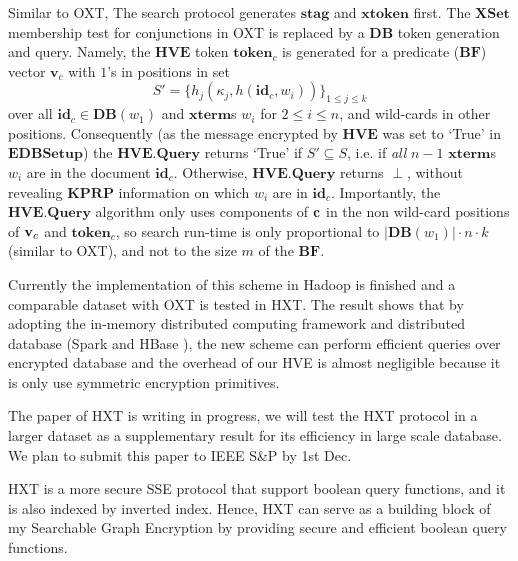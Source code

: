 Similar to OXT, The search protocol generates $\mathbf{stag}$ and $\mathbf{xtoken}$ first. The $\mathbf{XSet}$ membership test for conjunctions in OXT is replaced by a $\mathbf{DB}$ token generation and query. Namely, the $\mathbf{HVE}$ token $\mathbf{token}_c$ is generated for a predicate ($\mathbf{BF}$) vector $\mathbf{v}_c$ with $1$'s in positions in set 
$$S' = \{h_j(\kappa_j,h(\mathbf{id}_c,w_i))\}_{1\leq j\leq k}$$
over all $\mathbf{id}_c \in \mathbf{DB}(w_1)$ and $\mathbf{xterm}$s $w_i$ for $2\leq i\leq n$, and wild-cards in other positions. Consequently (as the message encrypted by $\mathbf{HVE}$ was set to `True' in $\mathbf{EDBSetup}$) the $\mathbf{HVE.Query}$ returns `True' if $S' \subseteq S$, i.e. if \emph{all} $n-1$ $\mathbf{xterm}$s $w_i$ are in the document $\mathbf{id}_c$. Otherwise, $\mathbf{HVE.Query}$ returns $\perp$, without revealing $\mathbf{KPRP}$ information on which $w_i$ are in $\mathbf{id}_c$. Importantly, the $\mathbf{HVE.Query}$ algorithm only uses components of ${\bf c}$ in the non wild-card positions of ${\bf v}_c$ and $\mathbf{token}_c$, so search run-time is only proportional to $|\mathbf{DB}(w_1)| \cdot n \cdot k$ (similar to OXT), and not to the size $m$ of the $\mathbf{BF}$.

Currently the implementation of this scheme in Hadoop is finished and a comparable dataset with OXT is tested in HXT. The result shows that by adopting the in-memory distributed computing framework and distributed database (Spark \cite{apache2017spark} and HBase \cite{apache2017hbase}), the new scheme can perform efficient queries over encrypted database and the overhead of our HVE is almost negligible because it is only use symmetric encryption primitives. 

The paper of HXT is writing in progress, we will test the HXT protocol in a larger dataset as a supplementary result for its efficiency in large scale database. We plan to submit this paper to IEEE S\&P by 1st Dec.

HXT is a more secure SSE protocol that support boolean query functions, and it is also indexed by inverted index. Hence, HXT can serve as a building block of my Searchable Graph Encryption by providing secure and efficient boolean query functions.

